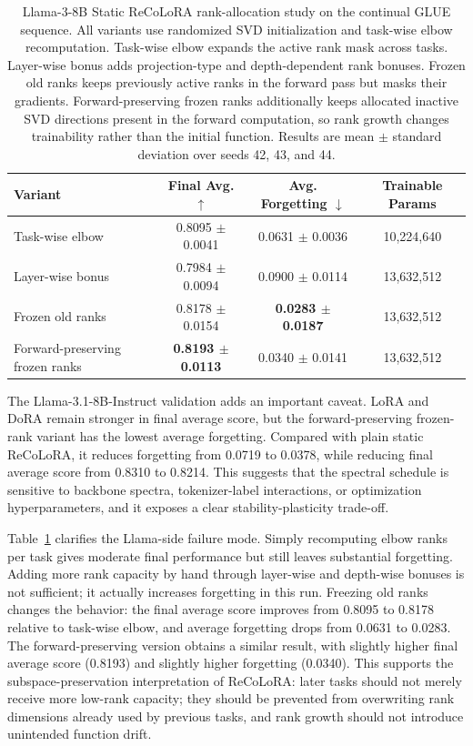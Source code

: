\documentclass[11pt]{article}
\begin{document}
\begin{table}[t]
\centering
\begin{tabular}{lccc}
\toprule
Variant & Final Avg. $\uparrow$ & Avg. Forgetting $\downarrow$ & Trainable Params \\
\midrule
Task-wise elbow & 0.8095 $\pm$ 0.0041 & 0.0631 $\pm$ 0.0036 & 10,224,640 \\
Layer-wise bonus & 0.7984 $\pm$ 0.0094 & 0.0900 $\pm$ 0.0114 & 13,632,512 \\
Frozen old ranks & 0.8178 $\pm$ 0.0154 & \textbf{0.0283 $\pm$ 0.0187} & 13,632,512 \\
Forward-preserving frozen ranks & \textbf{0.8193 $\pm$ 0.0113} & 0.0340 $\pm$ 0.0141 & 13,632,512 \\
\bottomrule
\end{tabular}
\caption{Llama-3-8B Static ReCoLoRA rank-allocation study on the continual GLUE sequence. All variants use randomized SVD initialization and task-wise elbow recomputation. Task-wise elbow expands the active rank mask across tasks. Layer-wise bonus adds projection-type and depth-dependent rank bonuses. Frozen old ranks keeps previously active ranks in the forward pass but masks their gradients. Forward-preserving frozen ranks additionally keeps allocated inactive SVD directions present in the forward computation, so rank growth changes trainability rather than the initial function. Results are mean $\pm$ standard deviation over seeds 42, 43, and 44.}
\label{tab:llama-rank-freezing}
\end{table}

The Llama-3.1-8B-Instruct validation adds an important caveat. LoRA and DoRA remain stronger in final average score, but the forward-preserving frozen-rank variant has the lowest average forgetting. Compared with plain static ReCoLoRA, it reduces forgetting from 0.0719 to 0.0378, while reducing final average score from 0.8310 to 0.8214. This suggests that the spectral schedule is sensitive to backbone spectra, tokenizer-label interactions, or optimization hyperparameters, and it exposes a clear stability-plasticity trade-off.

Table~\ref{tab:llama-rank-freezing} clarifies the Llama-side failure mode. Simply recomputing elbow ranks per task gives moderate final performance but still leaves substantial forgetting. Adding more rank capacity by hand through layer-wise and depth-wise bonuses is not sufficient; it actually increases forgetting in this run. Freezing old ranks changes the behavior: the final average score improves from 0.8095 to 0.8178 relative to task-wise elbow, and average forgetting drops from 0.0631 to 0.0283. The forward-preserving version obtains a similar result, with slightly higher final average score (0.8193) and slightly higher forgetting (0.0340). This supports the subspace-preservation interpretation of ReCoLoRA: later tasks should not merely receive more low-rank capacity; they should be prevented from overwriting rank dimensions already used by previous tasks, and rank growth should not introduce unintended function drift.
\end{document}
